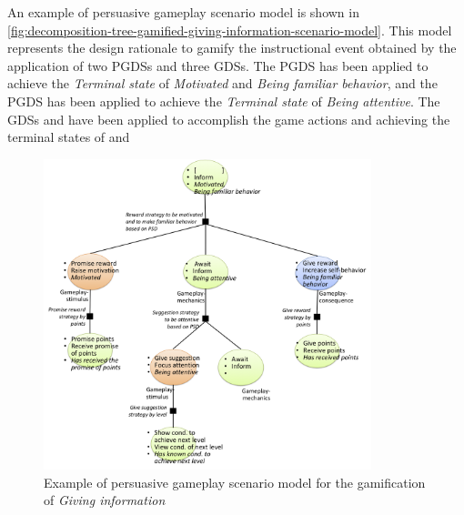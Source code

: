 An example of persuasive gameplay scenario model is shown in \autoref{fig:decomposition-tree-gamified-giving-information-scenario-model}. This model represents the design rationale to gamify the instructional event  obtained by the application of two PGDSs and three GDSs. The PGDS  has been applied to achieve the \emph{Terminal state} of \emph{Motivated} and \emph{Being familiar behavior}, and the PGDS  has been applied to achieve the \emph{Terminal state} of \emph{Being attentive}. The GDSs   and  have been applied to accomplish the game actions   and  achieving the terminal states of   and 

\begin{figure}[!htb]
 \caption{Example of persuasive gameplay scenario model for the gamification of \emph{Giving information}}
 \label{fig:decomposition-tree-gamified-giving-information-scenario-model}
 \centering
 \includegraphics[width=0.85\textwidth]{images/chap-ontogacles2/decomposition-tree-gamified-giving-information-scenario-model.png}
 \fautor
\end{figure}

